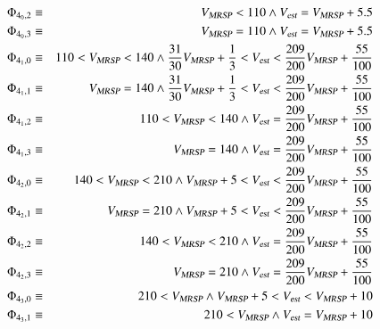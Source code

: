 \begin{eqnarray*}
\Phi_{4_0,2} & \equiv &   \vmax < 110 \wedge  \vest = \vmax + 5.5 
\\
\Phi_{4_0,3} & \equiv &   \vmax = 110 \wedge  \vest =\vmax + 5.5 
\\
\Phi_{4_1,0} & \equiv &   110 <\vmax  < 140 \wedge \frac{31}{30}\vmax +\frac{1}{3} < \vest <\frac{209}{200}\vmax +\frac{55}{100}
\\
\Phi_{4_1,1} & \equiv &   \vmax  = 140 \wedge \frac{31}{30}\vmax +\frac{1}{3} < \vest <\frac{209}{200}\vmax +\frac{55}{100}
\\
\Phi_{4_1,2} & \equiv &   110 <\vmax  < 140 \wedge  \vest =\frac{209}{200}\vmax +\frac{55}{100}
\\
\Phi_{4_1,3} & \equiv &   \vmax  = 140 \wedge \vest =\frac{209}{200}\vmax +\frac{55}{100}
\\
\Phi_{4_2,0} & \equiv & 140 < \vmax < 210 \wedge \vmax +5 < \vest <\frac{209}{200}\vmax +\frac{55}{100}
\\
\Phi_{4_2,1} & \equiv &  \vmax = 210 \wedge \vmax +5 < \vest <\frac{209}{200}\vmax +\frac{55}{100}
\\
\Phi_{4_2,2} & \equiv & 140 < \vmax < 210 \wedge  \vest= \frac{209}{200}\vmax +\frac{55}{100}
\\
\Phi_{4_2,3} & \equiv & \vmax = 210 \wedge  \vest= \frac{209}{200}\vmax +\frac{55}{100}
\\
\Phi_{4_3,0} & \equiv &  210 < \vmax  \wedge  \vmax +5 < \vest <\vmax + 10 
\\
\Phi_{4_3,1} & \equiv &  210 < \vmax  \wedge   \vest =\vmax + 10 
\end{eqnarray*}

